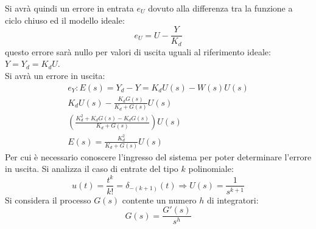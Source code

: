 \documentclass{article}
\numberwithin{equation}{subsection}
\begin{document}
Si avrà quindi un errore in entrata $e_U$ dovuto alla differenza tra la funzione a ciclo chiuso ed il modello ideale: 
\begin{equation}
    e_U=U-\displaystyle\frac{Y}{K_d}
\end{equation}
questo errore sarà nullo per valori di uscita uguali al riferimento ideale: $Y=Y_d=K_dU$.\\
Si avrà un errore in uscita:
\begin{gather}
    e_Y:E(s)=Y_d-Y=K_dU(s)-W(s)U(s)\\
    K_dU(s)-\displaystyle\frac{K_dG(s)}{K_d+G(s)}U(s)\\
    \left(\displaystyle\frac{K_d^2+K_dG(s)-K_dG(s)}{K_d+G(s)}\right)U(s)\\
    E(s)=\displaystyle\frac{K_d^2}{K_d+G(s)}U(s)
\end{gather}
Per cui è necessario conoscere l'ingresso del sistema per poter determinare l'errore in uscita. Si analizza il caso di entrate del tipo $k$ polinomiale: 
\begin{equation}
    u(t)=\displaystyle\frac{t^k}{k!}=\delta_{-(k+1)}(t)\Rightarrow U(s)=\displaystyle\frac{1}{s^{k+1}}
\end{equation}
Si considera il processo $G(s)$ contente un numero $h$ di integratori:
\begin{equation}
    G(s)=\displaystyle\frac{G'(s)}{s^h}
\end{equation}
\end{document}
